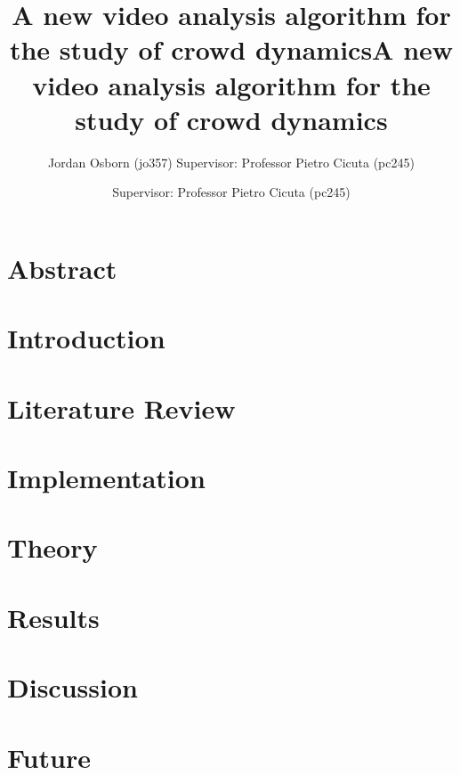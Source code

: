 \documentclass[11pt]{article}
\title{A new video analysis algorithm for the study of crowd dynamics}
\author{Jordan Osborn (jo357) Supervisor: Professor Pietro Cicuta (pc245)}
\begin{document}
\begin{titlingpage}
    \maketitle
\end{titlingpage}


\clearpage
\title{A new video analysis algorithm for the study of crowd dynamics}
\author{Supervisor: Professor Pietro Cicuta (pc245)}
\maketitle
\section*{Abstract}

\clearpage
\tableofcontents

\clearpage
\section{Introduction}



\clearpage
\section{Literature Review}

\clearpage
\section{Implementation}

\clearpage
\section{Theory}

\clearpage
\section{Results}

\clearpage
\section{Discussion}

\clearpage
\section{Future}
\end{document}
